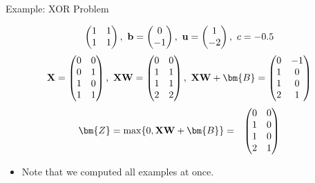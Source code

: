 \documentclass[11pt,compress,t,notes=noshow, xcolor=table]{beamer}
\begin{document}
\begin{vbframe}{Example: XOR Problem}
{\begin{eqnarray*}
\begin{pmatrix}
      1 & 1 \\
      1 & 1
    \end{pmatrix}, \
      \mathbf{b} = \begin{pmatrix}
      0 \\
      -1
    \end{pmatrix}, \
      \mathbf{u} = \begin{pmatrix}
      1 \\
      -2
    \end{pmatrix}, \
      c = - 0.5
  \end{eqnarray*}
  \begin{eqnarray*}
  \Xmat = \begin{pmatrix}
      0 & 0 \\
      0 & 1 \\
      1 & 0 \\
      1 & 1
    \end{pmatrix}, \
    \Xmat\Wmat = \begin{pmatrix}
      0 & 0 \\
      1 & 1 \\
      1 & 1 \\
      2 & 2
    \end{pmatrix}, \
      \Xmat \Wmat + \bm{B} = \begin{pmatrix}
        0 & -1 \\
        1 & 0 \\
        1 & 0 \\
        2 & 1
    \end{pmatrix}
  \end{eqnarray*}
  \begin{eqnarray*}
    \bm{Z} = \max\{0, \Xmat \Wmat+\bm{B}\}
    &=&
    \begin{pmatrix}
      0 & 0 \\
      1 & 0 \\
      1 & 0 \\
      2 & 1
    \end{pmatrix}
  \end{eqnarray*}
  \begin{itemize}
    \item Note that we computed all examples at once.
  \end{itemize}

}
\end{vbframe}
\end{document}

